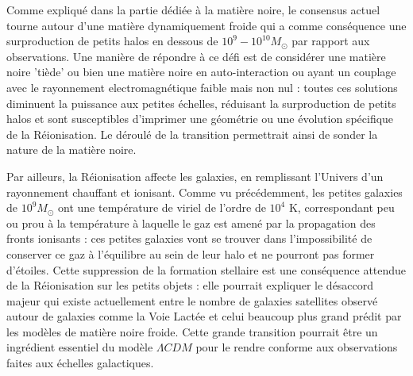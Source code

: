 Comme expliqué dans la partie dédiée à la matière noire, le consensus actuel tourne autour d'une matière dynamiquement froide qui a comme conséquence une surproduction de petits halos en dessous de $10^9-10^{10} M_\odot$ par rapport aux observations. Une manière de répondre à ce défi est de considérer une matière noire 'tiède' ou bien une matière noire en auto-interaction ou ayant un couplage avec le rayonnement electromagnétique faible mais non nul : toutes ces solutions diminuent la puissance aux petites échelles, réduisant la surproduction de petits halos et sont susceptibles d'imprimer une géométrie ou une évolution spécifique de la Réionisation. Le déroulé de la transition permettrait ainsi de sonder la nature de la matière noire.

Par ailleurs, la Réionisation affecte les galaxies, en remplissant l'Univers d'un rayonnement chauffant et ionisant. Comme vu précédemment, les petites galaxies de $10^9 M_\odot$ ont une température de viriel de l'ordre de $10^4$ K, correspondant peu ou prou à la température à laquelle le gaz est amené par la propagation des fronts ionisants : ces petites galaxies vont se trouver dans l'impossibilité de conserver ce gaz à l'équilibre au sein de leur halo et ne pourront pas former d'étoiles. Cette suppression de la formation stellaire est une conséquence attendue de la Réionisation sur les petits objets : elle pourrait expliquer le désaccord majeur qui existe actuellement entre le nombre de galaxies satellites observé autour de galaxies comme la Voie Lactée et celui beaucoup plus grand prédit par les modèles de matière noire froide. Cette grande transition pourrait être un ingrédient essentiel du modèle $\Lambda CDM$ pour le rendre conforme aux observations faites aux échelles galactiques.


